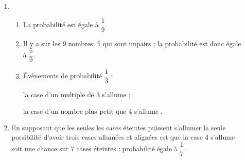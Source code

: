 \documentclass[10pt]{article}
\begin{document}
\begin{enumerate}
\item 
	\begin{enumerate}
		\item %
La probabilité est égale à $\dfrac{1}{9}$.
		\item %
		Il y a sur les 9 nombres, 5 qui sont impairs ; la probabilité est donc égale à $\dfrac{5}{9}$.		
		\item %
Évènements de probabilité  $\dfrac{1}{3}$ : 

\og la case d'un multiple de 3 s'allume \fg ;

\og la case d'un nombre plus petit que 4 s'allume \fg.
	\end{enumerate}
\item %
En supposant que les seules les cases éteintes puissent s'allumer la seule possibilité d'avoir trois cases allumées et alignées est que la case 4 s'allume soit une chance sur 7 cases éteintes : probabilité égale à $\dfrac{1}{7}$.
\end{enumerate}

\vspace{0,5cm}
\end{document}
